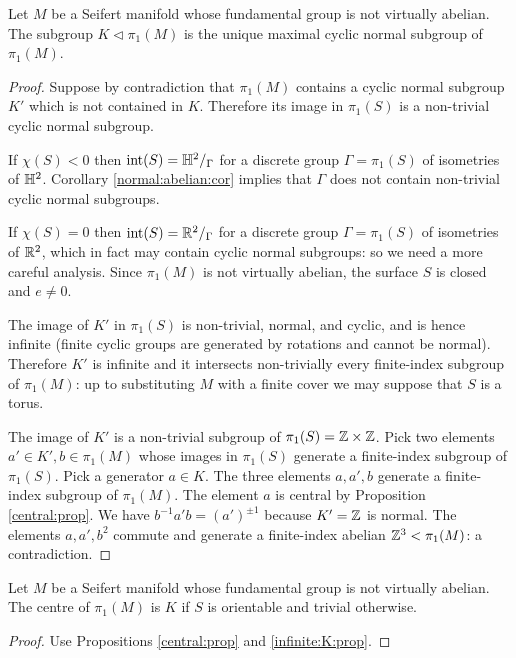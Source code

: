 \begin{prop}
Let $M$ be a Seifert manifold whose fundamental group is not virtually abelian. The subgroup $K\triangleleft \pi_1(M)$ is the unique maximal cyclic normal subgroup of $\pi_1(M)$.
\end{prop}
\begin{proof}
Suppose by contradiction that $\pi_1(M)$ contains a cyclic normal subgroup $K'$ which is not contained in $K$. Therefore its image in $\pi_1(S)$ is a non-trivial cyclic normal subgroup. 

If $\chi(S)<0$ then ${\rm int}(S) = \mathbb{H}^2/_\Gamma$ for a discrete group $\Gamma=\pi_1(S)$ of isometries of $\mathbb{H}^2$. Corollary \ref{normal:abelian:cor} implies that $\Gamma$ does not contain non-trivial cyclic normal subgroups.

If $\chi(S) = 0$ then ${\rm int}(S)=\mathbb{R}^2/_\Gamma$ for a discrete group $\Gamma = \pi_1(S)$ of isometries of $\mathbb{R}^2$, which in fact may contain cyclic normal subgroups: so we need a more careful analysis. Since $\pi_1(M)$ is not virtually abelian, the surface $S$ is closed and $e\neq 0$.

The image of $K'$ in $\pi_1(S)$ is non-trivial, normal, and cyclic, and is hence infinite (finite cyclic groups are generated by rotations and cannot be normal). Therefore $K'$ is infinite and it intersects non-trivially every finite-index subgroup of $\pi_1(M)$: up to substituting $M$ with a finite cover we may suppose that $S$ is a torus. 

The image of $K'$ is a non-trivial subgroup of $\pi_1(S) =\mathbb{Z} \times \mathbb{Z}$. 
Pick two elements $a' \in K', b \in \pi_1(M)$ whose images in $\pi_1(S)$ generate a finite-index subgroup of $\pi_1(S)$. Pick a generator $a\in K$. The three elements $a,a',b$ generate a finite-index subgroup of $\pi_1(M)$. The element $a$ is central by Proposition \ref{central:prop}. We have $b^{-1}a'b = (a')^{\pm 1}$ because $K' = \mathbb{Z} $ is normal.  The elements $a,a',b^2$ commute and generate a finite-index abelian $\mathbb{Z}^3<\pi_1(M)$: a contradiction.
\end{proof}

\begin{cor} \label{center:cor}
Let $M$ be a Seifert manifold whose fundamental group is not virtually abelian. The centre of $\pi_1(M)$ is $K$ if $S$ is orientable and trivial otherwise.
\end{cor}
\begin{proof}
Use Propositions \ref{central:prop} and \ref{infinite:K:prop}.
\end{proof}

